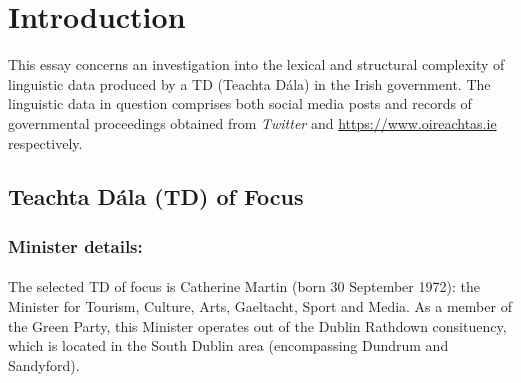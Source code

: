 \documentclass[a4paper,11pt]{article}
\begin{document}


\newcommand{\Tau}{\mathrm{T}}

\section{Introduction}
This essay concerns an investigation into the lexical and structural complexity of linguistic data produced by a TD (Teachta Dála) in the Irish government. The linguistic data in question comprises both social media posts and records of governmental proceedings obtained from \textit{Twitter} and \url{https://www.oireachtas.ie} respectively.

\subsection{Teachta Dála (TD) of Focus}
\subsubsection{Minister details:}
\paragraph{}
The selected TD of focus is Catherine Martin (born 30 September 1972): the Minister for Tourism, Culture, Arts, Gaeltacht, Sport and Media. As a member of the Green Party, this Minister operates out of the Dublin Rathdown consituency, which is located in the South Dublin area (encompassing Dundrum and Sandyford).
\end{document}
